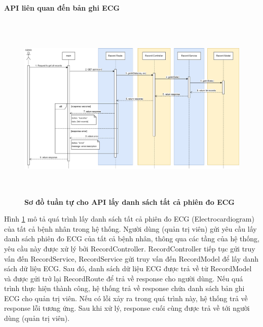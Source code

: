 \paragraph{API liên quan đến bản ghi ECG}
\mbox{}

\begin{figure}[H]
  \centering
  \includegraphics[width=16cm,height=9cm]{Images/sequence_api/getAllRecord.png}
  \caption[Sơ đồ tuần tự cho API lấy danh sách tất cả phiên đo ECG ]{\bfseries \fontsize{12pt}{0pt}
  \selectfont Sơ đồ tuần tự cho API lấy danh sách tất cả phiên đo ECG }
  \label{api_getAllEcgRecords} %
\end{figure}
Hình \ref{api_getAllEcgRecords} mô tả quá trình lấy danh sách tất cả phiên đo ECG (Electrocardiogram) của tất cả bệnh nhân trong hệ thống. Người dùng (quản trị viên) gửi yêu cầu lấy danh sách phiên đo ECG của tất cả bệnh nhân, thông qua các tầng của hệ thống, 
yêu cầu này được xử lý bởi RecordController. RecordController tiếp tục gửi truy vấn đến RecordService, RecordService gửi truy vấn đến RecordModel để lấy danh sách dữ liệu ECG. Sau đó, danh sách dữ liệu ECG được trả về từ RecordModel và được gửi trở lại RecordRoute
 để trả về response cho người dùng. Nếu quá trình thực hiện thành công, hệ thống trả về response chứa danh sách bản ghi ECG cho quản trị viên. Nếu có lỗi xảy ra trong quá trình này, hệ thống trả về response lỗi tương ứng. Sau khi xử lý, response cuối cùng được trả về tới người dùng (quản trị viên).

